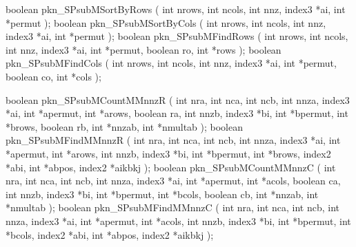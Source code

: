 \begin{listingC}
boolean pkn_SPsubMSortByRows ( int nrows, int ncols, int nnz,
                               index3 *ai, int *permut );
boolean pkn_SPsubMSortByCols ( int nrows, int ncols, int nnz,
                               index3 *ai, int *permut );
boolean pkn_SPsubMFindRows ( int nrows, int ncols, int nnz,
                             index3 *ai, int *permut, boolean ro,
                             int *rows );
boolean pkn_SPsubMFindCols ( int nrows, int ncols, int nnz,
                             index3 *ai, int *permut, boolean co,
                             int *cols );
\end{listingC}

\begin{listingC}
boolean pkn_SPsubMCountMMnnzR ( int nra, int nca, int ncb,
                                int nnza, index3 *ai,
                                int *apermut, int *arows, boolean ra,
                                int nnzb, index3 *bi,
                                int *bpermut, int *brows, boolean rb,
                                int *nnzab, int *nmultab );
boolean pkn_SPsubMFindMMnnzR ( int nra, int nca, int ncb,  
                               int nnza, index3 *ai, int *apermut, int *arows,
                               int nnzb, index3 *bi, int *bpermut, int *brows,
                               index2 *abi, int *abpos, index2 *aikbkj );
boolean pkn_SPsubMCountMMnnzC ( int nra, int nca, int ncb,
                                int nnza, index3 *ai,
                                int *apermut, int *acols, boolean ca,
                                int nnzb, index3 *bi,
                                int *bpermut, int *bcols, boolean cb,
                                int *nnzab, int *nmultab );
boolean pkn_SPsubMFindMMnnzC ( int nra, int nca, int ncb,  
                               int nnza, index3 *ai, int *apermut, int *acols,
                               int nnzb, index3 *bi, int *bpermut, int *bcols,
                               index2 *abi, int *abpos, index2 *aikbkj );
\end{listingC}

